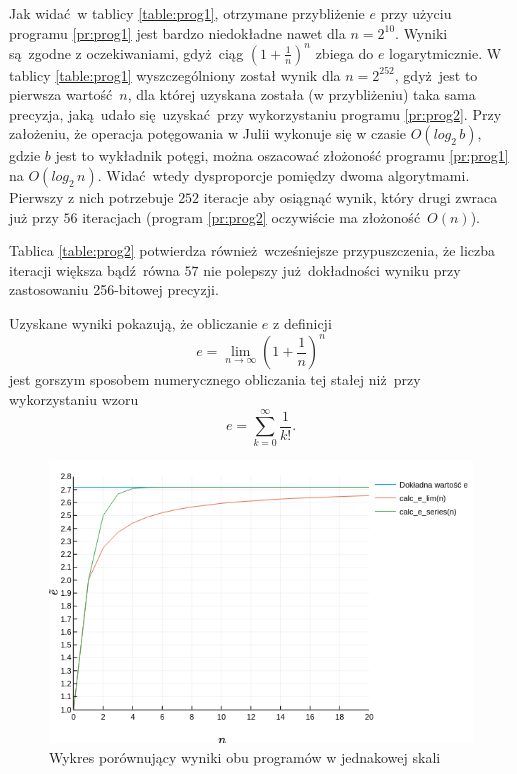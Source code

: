 \documentclass[12pt]{article}
\begin{document}
Jak widać w tablicy \ref{table:prog1}, otrzymane 
przybliżenie $e$ przy użyciu programu \ref{pr:prog1} jest bardzo niedokładne 
nawet dla $n = 2^{10}$. Wyniki są zgodne z oczekiwaniami, gdyż ciąg $(1+\frac{1}{n})^n$ 
zbiega do $e$ logarytmicznie. W tablicy \ref{table:prog1} wyszczególniony został 
wynik dla $n=2^{252}$, gdyż jest to pierwsza wartość $n$, dla której uzyskana 
została (w przybliżeniu) taka sama precyzja, jaką udało się uzyskać przy wykorzystaniu 
programu \ref{pr:prog2}. Przy założeniu, że operacja potęgowania w Julii wykonuje 
się w czasie $O(log_2\,b)$, gdzie $b$ jest to wykładnik potęgi, można oszacować
złożoność programu \ref{pr:prog1} na $O(log_2\,n)$. Widać wtedy dysproporcje pomiędzy
dwoma algorytmami. Pierwszy z nich potrzebuje $252$ iteracje aby osiągnąć wynik,
który drugi zwraca już przy $56$ iteracjach (program \ref{pr:prog2} oczywiście ma
złożoność $O(n)$).

Tablica \ref{table:prog2} potwierdza również wcześniejsze przypuszczenia, że
liczba iteracji większa bądź równa $57$ nie polepszy już dokładności wyniku przy
zastosowaniu 256-bitowej precyzji.

Uzyskane wyniki pokazują, że obliczanie $e$ z definicji
\large$$e = \lim\limits_{n \to \infty}{(1+\frac{1}{n})^n}$$\normalsize
jest gorszym sposobem numerycznego obliczania tej stałej niż przy
wykorzystaniu wzoru
\large$$e = \sum_{k=0}^{\infty}\frac{1}{k!}.$$\normalsize

\begin{figure}[H]
    \centering
    \includegraphics[scale=0.75]{plot3.png}
\caption{Wykres porównujący wyniki obu programów w jednakowej skali}
\label{figure:fig3}
\end{figure}
\end{document}
